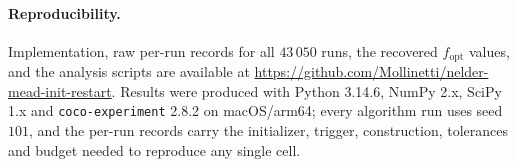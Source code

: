 \documentclass[11pt,a4paper]{article}
\begin{document}
\paragraph{Reproducibility.} Implementation, raw per-run records for all
$43\,050$ runs, the recovered $f_{\mathrm{opt}}$ values, and the analysis scripts
are available at
\url{https://github.com/Mollinetti/nelder-mead-init-restart}. Results were produced with Python 3.14.6, NumPy 2.x,
SciPy 1.x and \texttt{coco-experiment} 2.8.2 on macOS/arm64; every algorithm run
uses seed $101$, and the per-run records carry the initializer, trigger,
construction, tolerances and budget needed to reproduce any single cell.



\end{document}
